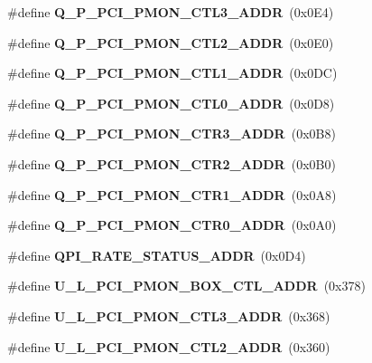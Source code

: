 \begin{DoxyCompactItemize}
\item 
\mbox{\label{types_8h_a61bcadc16b6f19e0d5b8f6c975fa641e}} 
\#define {\bfseries Q\+\_\+\+P\+\_\+\+P\+C\+I\+\_\+\+P\+M\+O\+N\+\_\+\+C\+T\+L3\+\_\+\+A\+D\+DR}~(0x0\+E4)
\item 
\mbox{\label{types_8h_afc483051e408adfbe86571ad821d9e4f}} 
\#define {\bfseries Q\+\_\+\+P\+\_\+\+P\+C\+I\+\_\+\+P\+M\+O\+N\+\_\+\+C\+T\+L2\+\_\+\+A\+D\+DR}~(0x0\+E0)
\item 
\mbox{\label{types_8h_a4d6a4c1abdae11ab4c6616b473ad315c}} 
\#define {\bfseries Q\+\_\+\+P\+\_\+\+P\+C\+I\+\_\+\+P\+M\+O\+N\+\_\+\+C\+T\+L1\+\_\+\+A\+D\+DR}~(0x0\+D\+C)
\item 
\mbox{\label{types_8h_a5d9c2ce10cf815eb05a1c2fa09875850}} 
\#define {\bfseries Q\+\_\+\+P\+\_\+\+P\+C\+I\+\_\+\+P\+M\+O\+N\+\_\+\+C\+T\+L0\+\_\+\+A\+D\+DR}~(0x0\+D8)
\item 
\mbox{\label{types_8h_a6c6ae71785936eb30a2be9586e239ff3}} 
\#define {\bfseries Q\+\_\+\+P\+\_\+\+P\+C\+I\+\_\+\+P\+M\+O\+N\+\_\+\+C\+T\+R3\+\_\+\+A\+D\+DR}~(0x0\+B8)
\item 
\mbox{\label{types_8h_a4053d31c743c734b64e7326617823ee8}} 
\#define {\bfseries Q\+\_\+\+P\+\_\+\+P\+C\+I\+\_\+\+P\+M\+O\+N\+\_\+\+C\+T\+R2\+\_\+\+A\+D\+DR}~(0x0\+B0)
\item 
\mbox{\label{types_8h_aae73f1b8f3a0d7a574395a7b472e1fd6}} 
\#define {\bfseries Q\+\_\+\+P\+\_\+\+P\+C\+I\+\_\+\+P\+M\+O\+N\+\_\+\+C\+T\+R1\+\_\+\+A\+D\+DR}~(0x0\+A8)
\item 
\mbox{\label{types_8h_aadb5219a896f99247fd4cd0ab62c656c}} 
\#define {\bfseries Q\+\_\+\+P\+\_\+\+P\+C\+I\+\_\+\+P\+M\+O\+N\+\_\+\+C\+T\+R0\+\_\+\+A\+D\+DR}~(0x0\+A0)
\item 
\mbox{\label{types_8h_acfc0a6e15dc1a230627717789bf9ccce}} 
\#define {\bfseries Q\+P\+I\+\_\+\+R\+A\+T\+E\+\_\+\+S\+T\+A\+T\+U\+S\+\_\+\+A\+D\+DR}~(0x0\+D4)
\item 
\mbox{\label{types_8h_ae248f9a13a36fae8ce2c954862a22f57}} 
\#define {\bfseries U\+\_\+\+L\+\_\+\+P\+C\+I\+\_\+\+P\+M\+O\+N\+\_\+\+B\+O\+X\+\_\+\+C\+T\+L\+\_\+\+A\+D\+DR}~(0x378)
\item 
\mbox{\label{types_8h_a0f585d5afc1bd61b2172940a0c11a4df}} 
\#define {\bfseries U\+\_\+\+L\+\_\+\+P\+C\+I\+\_\+\+P\+M\+O\+N\+\_\+\+C\+T\+L3\+\_\+\+A\+D\+DR}~(0x368)
\item 
\mbox{\label{types_8h_afadacc9e97e6770b1b7dac8a4f165932}} 
\#define {\bfseries U\+\_\+\+L\+\_\+\+P\+C\+I\+\_\+\+P\+M\+O\+N\+\_\+\+C\+T\+L2\+\_\+\+A\+D\+DR}~(0x360)
\item 

\end{DoxyCompactItemize}
